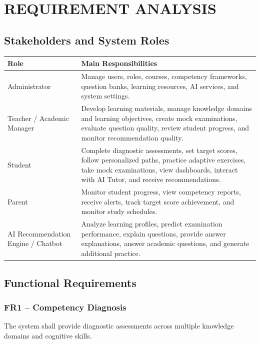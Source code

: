 \documentclass[12pt,a4paper]{report}
\begin{document}
\chapter{REQUIREMENT ANALYSIS}

\section{Stakeholders and System Roles}

\begin{longtable}{p{}p{}}
\toprule
\textbf{Role} & \textbf{Main Responsibilities}\\
\midrule
Administrator & Manage users, roles, courses, competency frameworks, question banks, learning resources, AI services, and system settings.\\
Teacher / Academic Manager & Develop learning materials, manage knowledge domains and learning objectives, create mock examinations, evaluate question quality, review student progress, and monitor recommendation quality.\\
Student & Complete diagnostic assessments, set target scores, follow personalized paths, practice adaptive exercises, take mock examinations, view dashboards, interact with AI Tutor, and receive recommendations.\\
Parent & Monitor student progress, view competency reports, receive alerts, track target score achievement, and monitor study schedules.\\
AI Recommendation Engine / Chatbot & Analyze learning profiles, predict examination performance, explain questions, provide answer explanations, answer academic questions, and generate additional practice.\\
\bottomrule
\end{longtable}

\section{Functional Requirements}

\subsection{FR1 -- Competency Diagnosis}
The system shall provide diagnostic assessments across multiple knowledge domains and cognitive skills.
\end{document}
